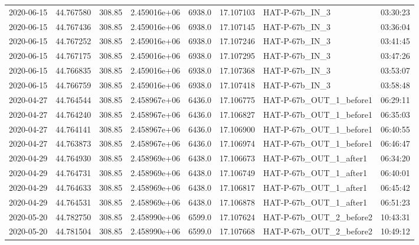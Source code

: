 \documentclass[modern]{aastex631}
\begin{document}
\begin{tabular}{lrrrlrll}
    2020-06-15 & 44.767580   & 308.85        & 2.459016e+06 & 6938.0 & 17.107103 & HAT-P-67b\_IN\_3           & 03:30:23 \\
    2020-06-15 & 44.767436   & 308.85        & 2.459016e+06 & 6938.0 & 17.107145 & HAT-P-67b\_IN\_3           & 03:36:04 \\
    2020-06-15 & 44.767252   & 308.85        & 2.459016e+06 & 6938.0 & 17.107246 & HAT-P-67b\_IN\_3           & 03:41:45 \\
    2020-06-15 & 44.767175   & 308.85        & 2.459016e+06 & 6938.0 & 17.107295 & HAT-P-67b\_IN\_3           & 03:47:26 \\
    2020-06-15 & 44.766835   & 308.85        & 2.459016e+06 & 6938.0 & 17.107368 & HAT-P-67b\_IN\_3           & 03:53:07 \\
    2020-06-15 & 44.766759   & 308.85        & 2.459016e+06 & 6938.0 & 17.107418 & HAT-P-67b\_IN\_3           & 03:58:48 \\
    2020-04-27 & 44.764544   & 308.85        & 2.458967e+06 & 6436.0 & 17.106775 & HAT-P-67b\_OUT\_1\_before1 & 06:29:11 \\
    2020-04-27 & 44.764240   & 308.85        & 2.458967e+06 & 6436.0 & 17.106827 & HAT-P-67b\_OUT\_1\_before1 & 06:35:03 \\
    2020-04-27 & 44.764141   & 308.85        & 2.458967e+06 & 6436.0 & 17.106900 & HAT-P-67b\_OUT\_1\_before1 & 06:40:55 \\
    2020-04-27 & 44.763873   & 308.85        & 2.458967e+06 & 6436.0 & 17.106974 & HAT-P-67b\_OUT\_1\_before1 & 06:46:47 \\
    2020-04-29 & 44.764930   & 308.85        & 2.458969e+06 & 6438.0 & 17.106673 & HAT-P-67b\_OUT\_1\_after1  & 06:34:20 \\
    2020-04-29 & 44.764731   & 308.85        & 2.458969e+06 & 6438.0 & 17.106749 & HAT-P-67b\_OUT\_1\_after1  & 06:40:01 \\
    2020-04-29 & 44.764633   & 308.85        & 2.458969e+06 & 6438.0 & 17.106817 & HAT-P-67b\_OUT\_1\_after1  & 06:45:42 \\
    2020-04-29 & 44.764531   & 308.85        & 2.458969e+06 & 6438.0 & 17.106878 & HAT-P-67b\_OUT\_1\_after1  & 06:51:23 \\
    2020-05-20 & 44.782750   & 308.85        & 2.458990e+06 & 6599.0 & 17.107624 & HAT-P-67b\_OUT\_2\_before2 & 10:43:31 \\
    2020-05-20 & 44.781504   & 308.85        & 2.458990e+06 & 6599.0 & 17.107668 & HAT-P-67b\_OUT\_2\_before2 & 10:49:12 \\

\end{tabular}
\end{document}
